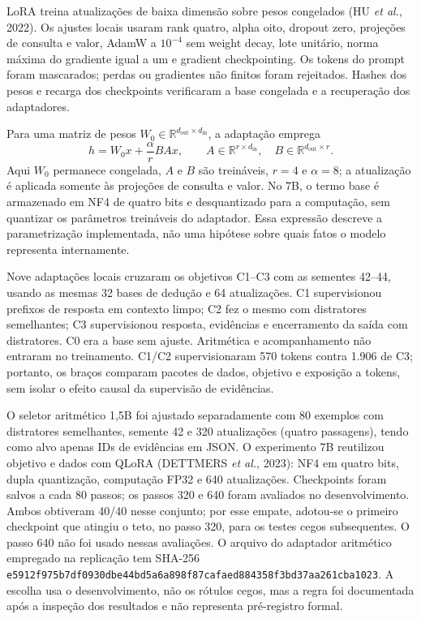 \documentclass[12pt,a4paper]{article}
\begin{document}
LoRA treina atualizações de baixa dimensão sobre pesos congelados (HU \textit{et al.}, 2022). Os ajustes locais usaram rank quatro, alpha oito, dropout zero, projeções de consulta e valor, AdamW a $10^{-4}$ sem weight decay, lote unitário, norma máxima do gradiente igual a um e gradient checkpointing. Os tokens do prompt foram mascarados; perdas ou gradientes não finitos foram rejeitados. Hashes dos pesos e recarga dos checkpoints verificaram a base congelada e a recuperação dos adaptadores.

Para uma matriz de pesos $W_0\in\mathbb{R}^{d_{\mathrm{out}}\times d_{\mathrm{in}}}$, a adaptação emprega
\begin{equation}\label{eq:lora-pt}
h=W_0x+\frac{\alpha}{r}BAx,\qquad
A\in\mathbb{R}^{r\times d_{\mathrm{in}}},\quad
B\in\mathbb{R}^{d_{\mathrm{out}}\times r}.
\end{equation}
Aqui $W_0$ permanece congelada, $A$ e $B$ são treináveis, $r=4$ e $\alpha=8$; a atualização é aplicada somente às projeções de consulta e valor. No 7B, o termo base é armazenado em NF4 de quatro bits e desquantizado para a computação, sem quantizar os parâmetros treináveis do adaptador. Essa expressão descreve a parametrização implementada, não uma hipótese sobre quais fatos o modelo representa internamente.

Nove adaptações locais cruzaram os objetivos C1--C3 com as sementes 42--44, usando as mesmas 32 bases de dedução e 64 atualizações. C1 supervisionou prefixos de resposta em contexto limpo; C2 fez o mesmo com distratores semelhantes; C3 supervisionou resposta, evidências e encerramento da saída com distratores. C0 era a base sem ajuste. Aritmética e acompanhamento não entraram no treinamento. C1/C2 supervisionaram 570 tokens contra 1.906 de C3; portanto, os braços comparam pacotes de dados, objetivo e exposição a tokens, sem isolar o efeito causal da supervisão de evidências.

O seletor aritmético 1,5B foi ajustado separadamente com 80 exemplos com distratores semelhantes, semente 42 e 320 atualizações (quatro passagens), tendo como alvo apenas IDs de evidências em JSON. O experimento 7B reutilizou objetivo e dados com QLoRA (DETTMERS \textit{et al.}, 2023): NF4 em quatro bits, dupla quantização, computação FP32 e 640 atualizações. Checkpoints foram salvos a cada 80 passos; os passos 320 e 640 foram avaliados no desenvolvimento. Ambos obtiveram 40/40 nesse conjunto; por esse empate, adotou-se o primeiro checkpoint que atingiu o teto, no passo 320, para os testes cegos subsequentes. O passo 640 não foi usado nessas avaliações. O arquivo do adaptador aritmético empregado na replicação tem SHA-256 \nolinkurl{e5912f975b7df0930dbe44bd5a6a898f87cafaed884358f3bd37aa261cba1023}. A escolha usa o desenvolvimento, não os rótulos cegos, mas a regra foi documentada após a inspeção dos resultados e não representa pré-registro formal.
\end{document}
